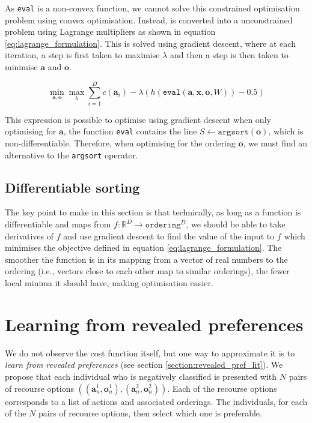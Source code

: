 As \texttt{eval} is a non-convex function, we cannot solve this constrained optimisation problem using convex optimisation. Instead, is converted into a unconstrained problem using Lagrange multipliers as shown in equation \ref{eq:lagrange_formulation}. This is solved using gradient descent, where at each iteration, a step is first taken to maximise $\lambda$ and then a step is then taken to minimise $\mathbf{a}$ and $\mathbf{o}$.

\begin{equation} \label{eq:lagrange_formulation}
	\min_{\mathbf{a, o}} \max_\lambda \sum_{i=1}^D c(\mathbf{a}_i) - \lambda (h(\texttt{eval}(\mathbf{a, x, o}, W))-0.5)
\end{equation}

This expression is possible to optimise using gradient descent when only optimising for $\mathbf{a}$, the function \texttt{eval} contains the line $S \leftarrow \texttt{argsort}(\mathbf{o})$, which is non-differentiable. Therefore, when optimising for the ordering $\mathbf{o}$, we must find an alternative to the \texttt{argsort} operator.

\subsection{Differentiable sorting}

The key point to make in this section is that technically, as long as a function is differentiable and maps from $f: \mathbb{R}^D \rightarrow \texttt{ordering}^D$, we should be able to take derivatives of $f$ and use gradient descent to find the value of the input to $f$ which minimises the objective defined in equation \ref{eq:lagrange_formulation}. The smoother the function is in its mapping from a vector of real numbers to the ordering (i.e., vectors close to each other map to similar orderings), the fewer local minima it should have, making optimisation easier.

\section{Learning from revealed preferences}


We do not observe the cost function itself, but one way to approximate it is to \textit{learn from revealed preferences} (see section \ref{section:revealed_pref_lit}). We propose that each individual who is negatively classified is presented with $N$ pairs of recourse options $((\mathbf{a}_n^1, \mathbf{o}_n^1),(\mathbf{a}_n^2, \mathbf{o}_n^2))$. Each of the recourse options corresponds to a list of actions and associated orderings. The individuals, for each of the $N$ pairs of recourse options, then select which one is preferable. 

